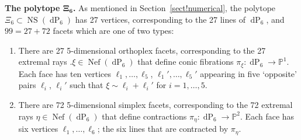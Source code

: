\documentclass[pdftex]{sigma}
\numberwithin{equation}{section}
\theoremstyle{definition}
\newcommand{\PP}{\mathbb{P}}
\DeclareMathOperator{\NS}{NS}
\DeclareMathOperator{\dP}{dP}
\DeclareMathOperator{\Nef}{Nef}
\begin{document}
{\bf The polytope $\boldsymbol{\Xi_6}$.}
As mentioned in Section~\ref{sect!numerical}, the polytope $\Xi_6\subset \NS(\dP_6)$ has 27 vertices, corresponding to the 27 lines of $\dP_6$, and $99=27+72$ facets which are one of two types:
\begin{enumerate}\itemsep=0pt
\item[(1)] There are 27 5-dimensional orthoplex facets, corresponding to the 27 extremal rays $.\xi\in \Nef(\dP_6)$ that define conic fibrations $\pi_\xi\colon \dP_6\to \PP^1$. Each face has ten vertices $\ell_1,\ldots,\ell_5$, $\ell_1',\ldots,\ell_5'$ appearing in five `opposite' pairs $\ell_i$, $\ell_i'$ such that $\xi\sim \ell_i + \ell_i'$ for $i=1,\ldots,5$.
\item[(2)] There are 72 5-dimensional simplex facets, corresponding to the 72 extremal rays $\eta\in \Nef(\dP_6)$ that define contractions $\pi_\eta\colon \dP_6\to \PP^2$. Each face has six vertices $\ell_1,\ldots,\ell_6$; the six lines that are contracted by $\pi_\eta$.
\end{enumerate}
\end{document}
